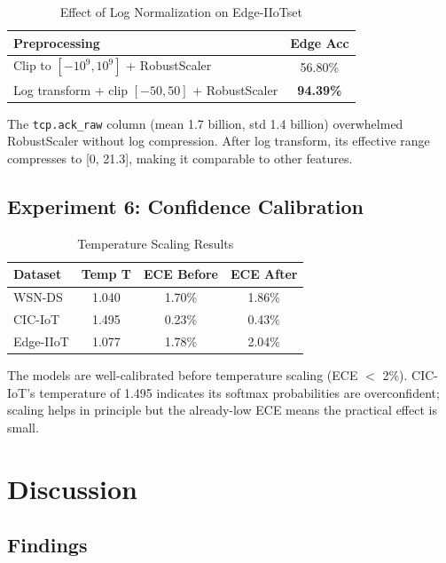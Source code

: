 \documentclass[conference]{IEEEtran}
\begin{document}
\begin{table}[h]
\centering
\caption{Effect of Log Normalization on Edge-IIoTset}
\label{tab:log-norm}
\begin{tabular}{lc}
\toprule
\textbf{Preprocessing} & \textbf{Edge Acc} \\
\midrule
Clip to $[-10^9, 10^9]$ + RobustScaler & 56.80\% \\
Log transform + clip $[-50, 50]$ + RobustScaler & \textbf{94.39\%} \\
\bottomrule
\end{tabular}
\end{table}

The \texttt{tcp.ack\_raw} column (mean 1.7 billion, std 1.4 billion) overwhelmed RobustScaler without log compression. After log transform, its effective range compresses to [0, 21.3], making it comparable to other features.

\subsection{Experiment 6: Confidence Calibration}

\begin{table}[h]
\centering
\caption{Temperature Scaling Results}
\label{tab:calibration}
\begin{tabular}{lccc}
\toprule
\textbf{Dataset} & \textbf{Temp T} & \textbf{ECE Before} & \textbf{ECE After} \\
\midrule
WSN-DS & 1.040 & 1.70\% & 1.86\% \\
CIC-IoT & 1.495 & 0.23\% & 0.43\% \\
Edge-IIoT & 1.077 & 1.78\% & 2.04\% \\
\bottomrule
\end{tabular}
\end{table}

The models are well-calibrated before temperature scaling (ECE $<$ 2\%). CIC-IoT's temperature of 1.495 indicates its softmax probabilities are overconfident; scaling helps in principle but the already-low ECE means the practical effect is small.

\section{Discussion}

\subsection{Findings}
\end{document}
